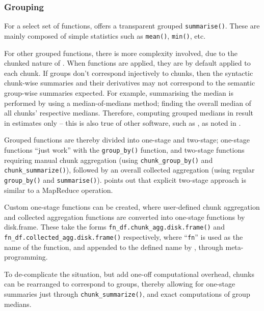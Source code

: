 \hypertarget{sec:spec-cons-group-by}{%
    \subsubsection{Grouping}\label{sec:spec-cons-group-by}}

For a select set of functions,  offers a transparent grouped
\texttt{summarise()}. These are mainly composed
of simple statistics such as \texttt{mean()},
\texttt{min()}, etc.

For other grouped functions, there is more complexity involved, due to
the chunked nature of . When functions are applied, they are
by default applied to each chunk. If groups don't correspond injectively
to chunks, then the syntactic chunk-wise summaries and their derivatives
may not correspond to the semantic group-wise summaries expected. For
example, summarising the median is performed by using a
median-of-medians method; finding the overall median of all chunks'
respective medians. Therefore, computing grouped medians in 
result in estimates only -- this is also true of other software, such
as , as noted in \cite{zj19:_group_by}.

Grouped functions are thereby divided into one-stage and two-stage;
one-stage functions ``just work'' with the
\texttt{group_by()} function, and two-stage
functions requiring manual chunk aggregation (using
\texttt{chunk_group_by()} and \texttt{chunk_summarize()}), followed by an
overall collected aggregation (using regular
\texttt{group_by()} and
\texttt{summarise()}). \cite{zj19:_group_by}
points out that explicit two-stage approach is similar to a MapReduce
operation.

Custom one-stage functions can be created, where user-defined chunk
aggregation and collected aggregation functions are converted into
one-stage functions by
disk.frame\cite{zj19:_custom_one_stage_group_by_funct}. These take
the forms
\texttt{fn_df.chunk_agg.disk.frame()} and
\texttt{fn_df.collected_agg.disk.frame()}
respectively, where ``\texttt{fn}'' is used as the name of the function,
and appended to the defined name by , through
meta-programming.

To de-complicate the situation, but add one-off computational overhead,
chunks can be rearranged to correspond to groups, thereby allowing for
one-stage summaries just through
\texttt{chunk_summarize()}, and exact
computations of group medians.

